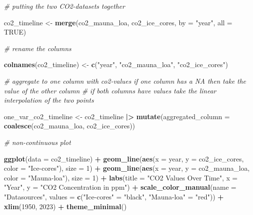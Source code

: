 \documentclass[
]{article}
\newenvironment{Shaded}{\begin{snugshade}}{\end{snugshade}}
\newcommand{\AttributeTok}[1]{\textcolor[rgb]{0.13,0.29,0.53}{#1}}
\newcommand{\CommentTok}[1]{\textcolor[rgb]{0.56,0.35,0.01}{\textit{#1}}}
\newcommand{\ConstantTok}[1]{\textcolor[rgb]{0.56,0.35,0.01}{#1}}
\newcommand{\DecValTok}[1]{\textcolor[rgb]{0.00,0.00,0.81}{#1}}
\newcommand{\FunctionTok}[1]{\textcolor[rgb]{0.13,0.29,0.53}{\textbf{#1}}}
\newcommand{\NormalTok}[1]{#1}
\newcommand{\OtherTok}[1]{\textcolor[rgb]{0.56,0.35,0.01}{#1}}
\newcommand{\SpecialCharTok}[1]{\textcolor[rgb]{0.81,0.36,0.00}{\textbf{#1}}}
\newcommand{\StringTok}[1]{\textcolor[rgb]{0.31,0.60,0.02}{#1}}
\begin{document}
\begin{Shaded}
\begin{Highlighting}[]
\CommentTok{\# putting the two CO2{-}datasets together }

\NormalTok{co2\_timeline }\OtherTok{\textless{}{-}} \FunctionTok{merge}\NormalTok{(co2\_mauna\_loa, co2\_ice\_cores, }\AttributeTok{by =} \StringTok{"year"}\NormalTok{, }\AttributeTok{all =} \ConstantTok{TRUE}\NormalTok{)}

\CommentTok{\# rename the columns}

\FunctionTok{colnames}\NormalTok{(co2\_timeline) }\OtherTok{\textless{}{-}} \FunctionTok{c}\NormalTok{(}\StringTok{"year"}\NormalTok{, }\StringTok{"co2\_mauna\_loa"}\NormalTok{, }\StringTok{"co2\_ice\_cores"}\NormalTok{)}

\CommentTok{\# aggregate to one column with co2{-}values if one column has a NA then take the value of the other column}
\CommentTok{\# if both columns have values take the linear interpolation of the two points}

\NormalTok{one\_var\_co2\_timeline }\OtherTok{\textless{}{-}}\NormalTok{ co2\_timeline }\SpecialCharTok{|\textgreater{}}
  \FunctionTok{mutate}\NormalTok{(}\AttributeTok{aggregated\_column =} \FunctionTok{coalesce}\NormalTok{(co2\_mauna\_loa, co2\_ice\_cores))}


\CommentTok{\# non{-}continuous plot}

\FunctionTok{ggplot}\NormalTok{(}\AttributeTok{data =}\NormalTok{ co2\_timeline) }\SpecialCharTok{+}
  \FunctionTok{geom\_line}\NormalTok{(}\FunctionTok{aes}\NormalTok{(}\AttributeTok{x =}\NormalTok{ year, }\AttributeTok{y =}\NormalTok{ co2\_ice\_cores, }\AttributeTok{color =} \StringTok{"Ice{-}cores"}\NormalTok{), }\AttributeTok{size =} \DecValTok{1}\NormalTok{) }\SpecialCharTok{+}
  \FunctionTok{geom\_line}\NormalTok{(}\FunctionTok{aes}\NormalTok{(}\AttributeTok{x =}\NormalTok{ year, }\AttributeTok{y =}\NormalTok{ co2\_mauna\_loa, }\AttributeTok{color =} \StringTok{"Mauna{-}loa"}\NormalTok{), }\AttributeTok{size =} \DecValTok{1}\NormalTok{) }\SpecialCharTok{+}
  \FunctionTok{labs}\NormalTok{(}\AttributeTok{title =} \StringTok{"CO2 Values Over Time"}\NormalTok{,}
       \AttributeTok{x =} \StringTok{"Year"}\NormalTok{,}
       \AttributeTok{y =} \StringTok{"CO2 Concentration in ppm"}\NormalTok{) }\SpecialCharTok{+}
  \FunctionTok{scale\_color\_manual}\NormalTok{(}\AttributeTok{name =} \StringTok{"Datasources"}\NormalTok{, }\AttributeTok{values =} \FunctionTok{c}\NormalTok{(}\StringTok{"Ice{-}cores"} \OtherTok{=} \StringTok{"black"}\NormalTok{, }\StringTok{"Mauna{-}loa"} \OtherTok{=} \StringTok{"red"}\NormalTok{)) }\SpecialCharTok{+}
  \FunctionTok{xlim}\NormalTok{(}\DecValTok{1950}\NormalTok{, }\DecValTok{2023}\NormalTok{) }\SpecialCharTok{+}
  \FunctionTok{theme\_minimal}\NormalTok{()}
\end{Highlighting}
\end{Shaded}
\end{document}
